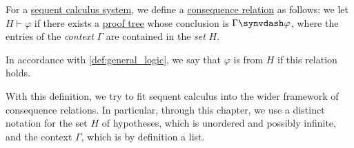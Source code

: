 \begin{definition}\label{def:sequent_calculus_consequence}\mimprovised
  For a \hyperref[def:abstract_sequent_calculus_system]{sequent calculus system}, we define a \hyperref[def:consequence_relation]{consequence relation} as follows: we let \( H \vdash \varphi \) if there exists a \hyperref[def:sequent_calculus_proof_tree]{proof tree} whose conclusion is \( \Gamma \synvdash \varphi \), where the entries of the \emph{context} \( \Gamma \) are contained in the \emph{set} \( H \).

  In accordance with \cref{def:general_logic}, we say that \( \varphi \) is  from \( H \) if this relation holds.
\end{definition}
\begin{comments}
  \item With this definition, we try to fit sequent calculus into the wider framework of consequence relations. In particular, through this chapter, we use a distinct notation for the set \( H \) of hypotheses, which is unordered and possibly infinite, and the context \( \Gamma \), which is by definition a list.
\end{comments}
